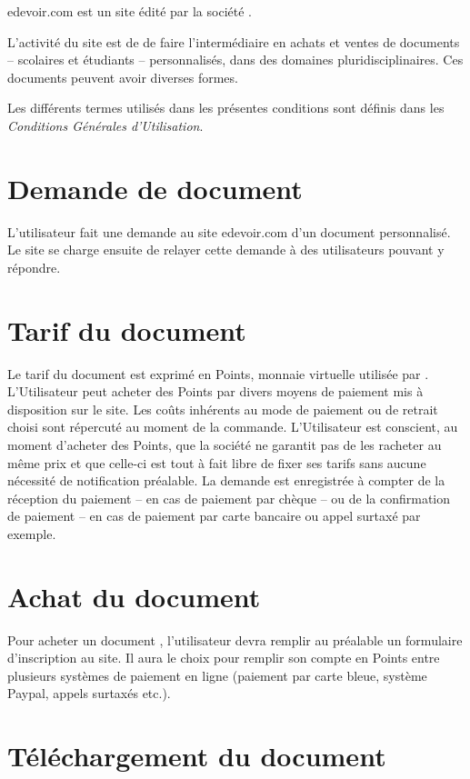 edevoir.com est un site édité par la société \eDevoir.

L'activité du site est de de faire l'intermédiaire en achats et ventes de documents -- scolaires et étudiants -- personnalisés, dans des domaines pluridisciplinaires. Ces documents peuvent avoir diverses formes.

Les différents termes utilisés dans les présentes conditions sont définis dans les \textit{Conditions Générales d'Utilisation}.

\section{Demande de document}

L'utilisateur fait une demande au site edevoir.com d'un document personnalisé. Le site se charge ensuite de relayer cette demande à des utilisateurs pouvant y répondre.

\section{Tarif du document}

Le tarif du document est exprimé en Points, monnaie virtuelle utilisée par \eDevoir. L'Utilisateur peut acheter des Points par divers moyens de paiement mis à disposition sur le site. Les coûts inhérents au mode de paiement ou de retrait choisi sont répercuté au moment de la commande. L'Utilisateur est conscient, au moment d'acheter des Points, que la société \eDevoir ne garantit pas de les racheter au même prix et que celle-ci est tout à fait libre de fixer ses tarifs sans aucune nécessité de notification préalable.
La demande est enregistrée à compter de la réception du paiement -- en cas de paiement par chèque -- ou de la confirmation de paiement -- en cas de paiement par carte bancaire ou appel surtaxé par exemple.

\section{Achat du document}

Pour acheter un document , l'utilisateur devra remplir au préalable un formulaire d'inscription au site. Il aura le choix pour remplir son compte en Points entre plusieurs systèmes de paiement en ligne (paiement par carte bleue, système Paypal, appels surtaxés etc.).

\section{Téléchargement du document}

